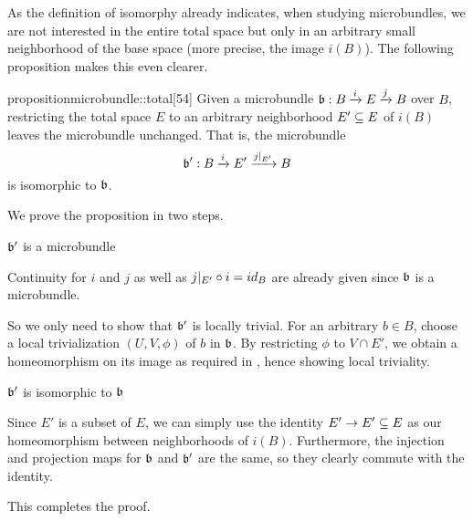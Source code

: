 \begin{myparagraph}
    As the definition of isomorphy already indicates, when studying microbundles,
    we are not interested in the entire total space
    but only in an arbitrary small neighborhood of the base space (more precise, the image $i(B)$).
    The following proposition makes this even clearer.
    
\end{myparagraph}

\begin{mystatement}{proposition}{microbundle::total}[54]
    Given a microbundle $\bundledef{\bb}{B}{E}{i}{j}$ over $B$,
    restricting the total space $E$ to an
    arbitrary neighborhood $E' \subseteq{} E$ of $i(B)$ leaves the microbundle unchanged.
    That is, the microbundle
    \[ \bundledef{\bb'}{B}{E'}{i}{j\restr{E'}} \]
    is isomorphic to $\bb$.
\end{mystatement}

\begin{myproof}
    We prove the proposition in two steps.
    \begin{steps}
        \item $\bb'$ is a microbundle
        
        Continuity for $i$ and $j$ as well as $j\vert_{E'} \circ i = id_B$ are already given since $\bb$ is a microbundle.

        So we only need to show that $\bb'$ is locally trivial.
        For an arbitrary $b \in B$, choose a local trivialization $(U, V, \phi)$ of $b$ in $\bb$.
        By restricting $\phi$ to $V \cap E'$,
        we obtain a homeomorphism on its image as required in ,
        hence showing local triviality.
        
        \item $\bb'$ is isomorphic to $\bb$

        Since $E'$ is a subset of $E$,
        we can simply use the identity $E' \to E' \subseteq{} E$
        as our homeomorphism between neighborhoods of $i(B)$.
        Furthermore, the injection and projection maps for $\bb$ and $\bb'$ are the same,
        so they clearly commute with the identity.
    \end{steps}
    This completes the proof.
\end{myproof}